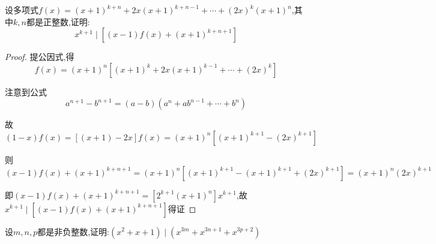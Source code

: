 \begin{example}
    设多项式$f(x)=(x+1)^{k+n}+2x(x+1)^{k+n-1}+\cdots +(2x)^k(x+1)^n$,其中$k,n$都是正整数,证明:
    \begin{equation*}
        x^{k+1}\mid [(x-1)f(x)+(x+1)^{k+n+1}]
    \end{equation*}
\end{example}

\begin{proof}
    提公因式,得
    \begin{equation*}
        f(x)=(x+1)^n[(x+1)^k+2x(x+1)^{k-1}+\cdots + (2x)^k]
    \end{equation*}

    注意到公式
    \begin{equation}
        a^{n+1}-b^{n+1}=(a-b)(a^n+ab^{n-1}+\cdots +b^n) \label{1.1.4}
    \end{equation}


    故
    \begin{equation*}
        (1-x)f(x)=[(x+1)-2x]f(x)=(x+1)^n[(x+1)^{k+1}-(2x)^{k+1}]
    \end{equation*}

    则
    \begin{equation*}
        (x-1)f(x)+(x+1)^{k+n+1}=(x+1)^n[(x+1)^{k+1}-(x+1)^{k+1}+(2x)^{k+1}]=(x+1)^n(2x)^{k+1}
    \end{equation*}

    即$(x-1)f(x)+(x+1)^{k+n+1}=[2^{k+1}(x+1)^n]x^{k+1}$,故$x^{k+1}\mid [(x-1)f(x)+(x+1)^{k+n+1}]$得证
\end{proof}

\clearpage

\begin{example}
    设$m,n,p$都是非负整数,证明:$(x^2+x+1)\mid (x^{3m}+x^{3n+1}+x^{3p+2})$
\end{example}

